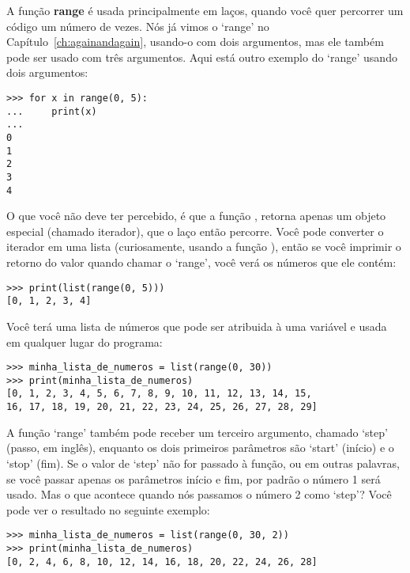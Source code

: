 A função \textbf{range} é usada principalmente em laços, quando você quer percorrer um código um número de vezes. Nós já vimos o `range' no Capítulo~\ref{ch:againandagain}, usando-o com dois argumentos, mas ele também pode ser usado com três argumentos. Aqui está outro exemplo do `range' usando dois argumentos:

\begin{listing}
\begin{verbatim}
>>> for x in range(0, 5):
...     print(x)
... 
0
1
2
3
4
\end{verbatim}
\end{listing}

\noindent
O que você não deve ter percebido, é que a função , retorna apenas um objeto especial (chamado iterador), que o laço então percorre. Você pode converter o iterador em uma lista (curiosamente, usando a função ), então se você imprimir o retorno do valor quando chamar o `range', você verá os números que ele contém:

\begin{listing}
\begin{verbatim}
>>> print(list(range(0, 5)))
[0, 1, 2, 3, 4]
\end{verbatim}
\end{listing}

\noindent
Você terá uma lista de números que pode ser atribuida à uma variável e usada em qualquer lugar do programa:

\begin{listingignore}
\begin{verbatim}
>>> minha_lista_de_numeros = list(range(0, 30))
>>> print(minha_lista_de_numeros)
[0, 1, 2, 3, 4, 5, 6, 7, 8, 9, 10, 11, 12, 13, 14, 15, 
16, 17, 18, 19, 20, 21, 22, 23, 24, 25, 26, 27, 28, 29]
\end{verbatim}
\end{listingignore}

\noindent
A função `range' também pode receber um terceiro argumento, chamado `step' (passo, em inglês), enquanto os dois primeiros parâmetros são `start' (início) e o `stop' (fim). Se o valor de `step' não for passado à função, ou em outras palavras, se você passar apenas os parâmetros início e fim, por padrão o número 1 será usado. Mas o que acontece quando nós passamos o número 2 como `step'? Você pode ver o resultado no seguinte exemplo:

\begin{listing}
\begin{verbatim}
>>> minha_lista_de_numeros = list(range(0, 30, 2))
>>> print(minha_lista_de_numeros)
[0, 2, 4, 6, 8, 10, 12, 14, 16, 18, 20, 22, 24, 26, 28]
\end{verbatim}
\end{listing}

